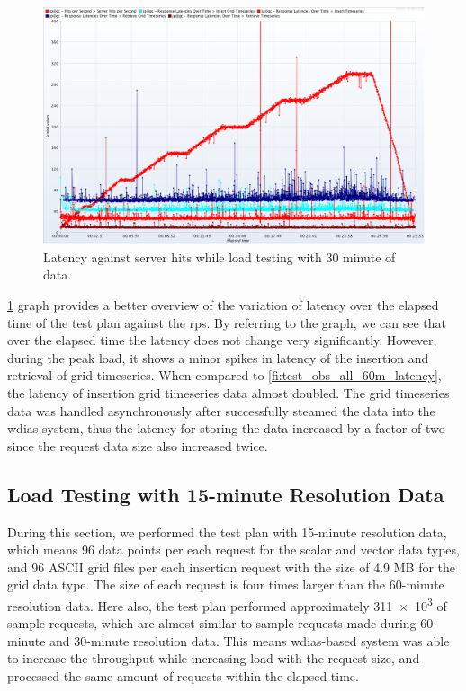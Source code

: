 \begin{figure}[htp]
    \centering
    \includegraphics[width=1.0\textwidth]{results/obs/all/obs_all_30m_res_latencies_against_hits.png}
    \caption{Latency against server hits while load testing with 30 minute of data.}
    \label{fi:test_obs_all_30m_latency}
\end{figure}
\cref{fi:test_obs_all_30m_latency} graph provides a better overview of the variation of latency over the elapsed time of the test plan against the \acrshort{rps}. By referring to the graph, we can see that over the elapsed time the latency does not change very significantly. However, during the peak load, it shows a minor spikes in latency of the insertion and retrieval of grid timeseries. When compared to \cref{fi:test_obs_all_60m_latency}, the latency of insertion grid timeseries data almost doubled. The grid timeseries data was handled asynchronously after successfully steamed the data into the \acrshort{wdias} system, thus the latency for storing the data increased by a factor of two since the request data size also increased twice.


\subsection{Load Testing with 15-minute Resolution Data}
\label{subse:obs_test_plan_all_15min}

During this section, we performed the test plan with 15-minute resolution data, which means 96 data points per each request for the scalar and vector data types, and 96 ASCII grid files per each insertion request with the size of 4.9 MB for the grid data type. The size of each request is four times larger than the 60-minute resolution data. Here also, the test plan performed approximately \num{311e3} of sample requests, which are almost similar to sample requests made during 60-minute and 30-minute resolution data. This means \acrshort{wdias}-based system was able to increase the throughput while increasing load with the request size, and processed the same amount of requests within the elapsed time.

